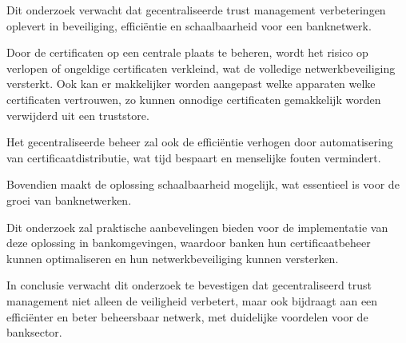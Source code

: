 Dit onderzoek verwacht dat gecentraliseerde trust management verbeteringen oplevert in beveiliging, efficiëntie en schaalbaarheid voor een banknetwerk.

Door de certificaten op een centrale plaats te beheren, wordt het risico op verlopen of ongeldige certificaten verkleind, wat de volledige netwerkbeveiliging versterkt. Ook kan er makkelijker worden aangepast welke apparaten welke certificaten vertrouwen, zo kunnen onnodige certificaten gemakkelijk worden verwijderd uit een truststore.

Het gecentraliseerde beheer zal ook de efficiëntie verhogen door automatisering van certificaatdistributie, wat tijd bespaart en menselijke fouten vermindert.

Bovendien maakt de oplossing schaalbaarheid mogelijk, wat essentieel is voor de groei van banknetwerken.

Dit onderzoek zal praktische aanbevelingen bieden voor de implementatie van deze oplossing in bankomgevingen, waardoor banken hun certificaatbeheer kunnen optimaliseren en hun netwerkbeveiliging kunnen versterken.

In conclusie verwacht dit onderzoek te bevestigen dat gecentraliseerd trust management niet alleen de veiligheid verbetert, maar ook bijdraagt aan een efficiënter en beter beheersbaar netwerk, met duidelijke voordelen voor de banksector. 